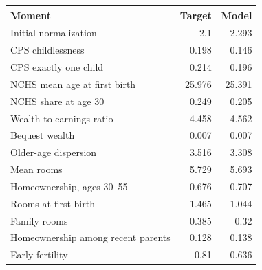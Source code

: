 \begin{tabular}{lrr}
\toprule
Moment & Target & Model \\
\midrule
Initial normalization & 2.1 & 2.293 \\
CPS childlessness & 0.198 & 0.146 \\
CPS exactly one child & 0.214 & 0.196 \\
NCHS mean age at first birth & 25.976 & 25.391 \\
NCHS share at age 30 & 0.249 & 0.205 \\
Wealth-to-earnings ratio & 4.458 & 4.562 \\
Bequest wealth & 0.007 & 0.007 \\
Older-age dispersion & 3.516 & 3.308 \\
Mean rooms & 5.729 & 5.693 \\
Homeownership, ages 30--55 & 0.676 & 0.707 \\
Rooms at first birth & 1.465 & 1.044 \\
Family rooms & 0.385 & 0.32 \\
Homeownership among recent parents & 0.128 & 0.138 \\
Early fertility & 0.81 & 0.636 \\
\bottomrule
\end{tabular}
